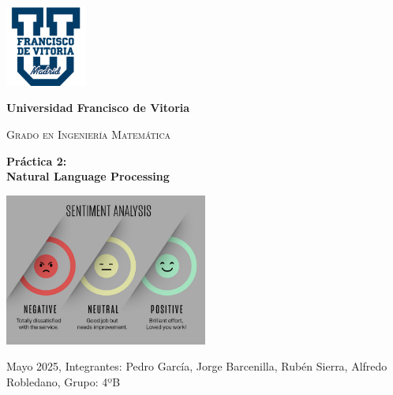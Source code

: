\begin{titlepage}
    \begin{center}
        \justify
        \vspace{1cm}
        
        \includegraphics[width=0.2\textwidth]{ImagenesLatex/ufv_logo}
        \vspace{1cm}
        
        \LARGE\textbf{Universidad Francisco de Vitoria}
        \vspace{0.5cm}
        
        \Large\textsc{Grado en Ingeniería Matemática}
        \vspace{1cm}
        
        
        \Huge\textbf{Práctica 2: \\ Natural Language Processing}

        \begin{center}
            \includegraphics[width=0.5\textwidth]{ImagenesLatex/sentiment-analysis.jpg}
        \end{center}

        \Large\textmd{Mayo 2025, Integrantes: Pedro García, Jorge Barcenilla, Rubén Sierra, Alfredo Robledano, Grupo: 4ºB}
        \vfill
        
    \end{center}
\end{titlepage}
